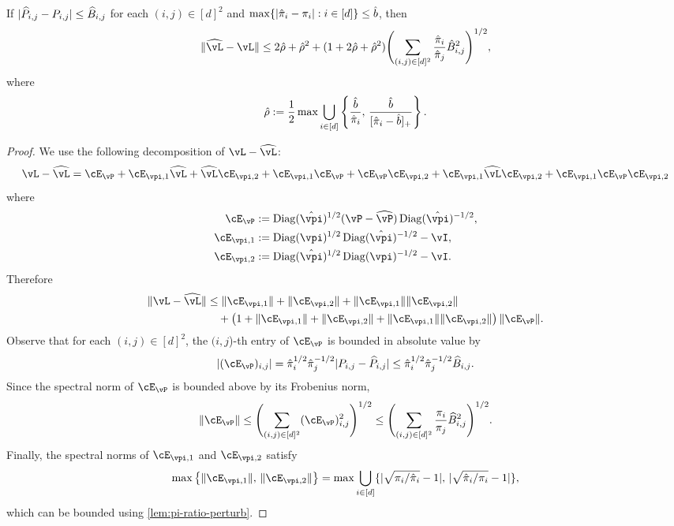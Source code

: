 \begin{lemma}
  \label{lem:L-obs-bound}
  If
  $|\widehat{P}_{i,j} - P_{i,j}| \leq \widehat{B}_{i,j}$ for each $(i,j) \in
  [d]^2$ and
  $\max\{|\hat\pi_i-\pi_i| : i \in [d]\} \leq \hat{b}$,
  then
  \[
    \norm{\wh\vL - \vL}
    \leq
    2\hat\rho + \hat\rho^2
    + (1+2\hat\rho+\hat\rho^2)
    \Biggl(
      \sum_{(i,j)\in[d]^2} \frac{\hat\pi_i}{\hat\pi_j} \hat{B}_{i,j}^2
    \Biggr)^{1/2}
    ,
  \]
  where
  \[
    \hat\rho := \frac12 \max \bigcup_{i\in[d]}
    \left\{
      \frac{\hat{b}}{\hat\pi_i},\,
      \frac{\hat{b}}{[\hat\pi_i-\hat{b}]_+}
    \right\}
    .
  \]
\end{lemma}
\begin{proof}
  We use the following decomposition of $\vL - \wh\vL$:
  \[
    \vL - \wh\vL
    = \errP
    + \errpil \wh\vL
    + \wh\vL \errpir
    + \errpil \errP
    + \errP \errpir
    + \errpil \wh\vL \errpir
    + \errpil \errP \errpir
  \]
  where
  \begin{align*}
    \errP
    & := \Diag(\hat\vpi)^{1/2} \parens{ \vP - \wh\vP } \Diag(\hat\vpi)^{-1/2} ,
    \\
    \errpil
    & := \Diag(\vpi)^{1/2} \Diag(\hat\vpi)^{-1/2} - \vI ,
    \\
    \errpir
    & := \Diag(\hat\vpi)^{1/2} \Diag(\vpi)^{-1/2} - \vI .
  \end{align*}
  Therefore
  \begin{align*}
    \norm{\vL - \wh\vL}
    & \leq
    \norm{\errpil} + \norm{\errpir} + \norm{\errpil} \norm{\errpir}
    \\
    & \quad
    + \Parens{
      1 + \norm{\errpil} + \norm{\errpir} + \norm{\errpil} \norm{\errpir}
    }
    \norm{\errP}
    .
  \end{align*}
  Observe that for each $(i,j) \in [d]^2$, the $(i,j$)-th entry of
  $\errP$ is bounded in absolute value by
  \[
    |(\errP)_{i,j}|
    = \hat{\pi}_i^{1/2} \hat{\pi}_j^{-1/2} |P_{i,j} - \wh{P}_{i,j}|
    \leq
    \hat\pi_i^{1/2} \hat{\pi}_j^{-1/2} \wh{B}_{i,j}
    .
  \]
  Since the spectral norm of $\errP$ is bounded above by its Frobenius
  norm,
  \[
    \norm{\errP}
    \leq \Biggl(
      \sum_{(i,j) \in [d]^2}
      (\errP)_{i,j}^2
    \Biggr)^{1/2}
    \leq \Biggl(
      \sum_{(i,j) \in [d]^2}
      \frac{\pi_i}{\pi_j} \wh{B}_{i,j}^2
    \Biggr)^{1/2}
    .
  \]
  Finally, the spectral norms of $\errpil$ and $\errpir$ satisfy
  \[
    \max\Braces{ \norm{\errpil} ,\, \norm{\errpir} }
    =
    \max\bigcup_{i\in[d]}
    \braces{
      \abs{\sqrt{\pi_i/\hat\pi_i}-1},\,
      \abs{\sqrt{\hat\pi_i/\pi_i}-1}
    }
    ,
  \]
  which can be bounded using \cref{lem:pi-ratio-perturb}.
\end{proof}

